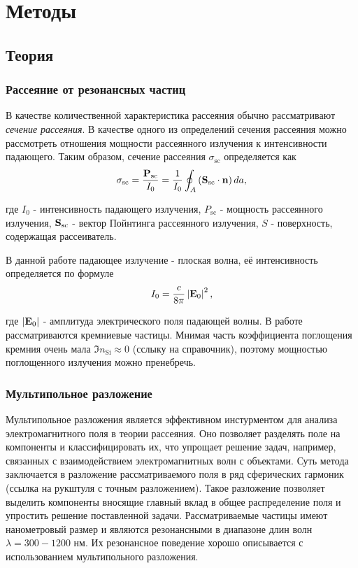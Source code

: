\chapter{Методы}


\section{Теория}\label{sec:theory}

\subsection{Рассеяние от резонансных частиц}\label{subsec:scat_cs}

В качестве количественной характеристика рассеяния обычно рассматривают \textit{сечение рассеяния}. В качестве одного из определений сечения рассеяния можно рассмотреть отношения мощности рассеянного излучения к интенсивности падающего. Таким образом, сечение рассеяния $\sigma_{\text{sc}}$ определяется как
\begin{equation}
    \sigma_{\text{sc}} = \frac{\vb{P_{\text{sc}}}}{I_0} = \frac{1}{I_0} \oint_A  \left(  \mathbf{S}_{\text{sc}} \cdot \vb{n} \right) da,
\end{equation}

где $I_0$ - интенсивность падающего излучения, $P_{\text{sc}}$ - мощность рассеянного излучения, $\vb{S}_{\text{sc}}$ - вектор Пойнтинга рассеянного излучения, $S$ - поверхность, содержащая рассеиватель.

В данной работе падающее излучение - плоская волна, её интенсивность определяется по формуле
\begin{equation}
    I_0 = \frac{c}{8\pi} \left| \vb{E}_0 \right|^2,
\end{equation}

где $\left| \vb{E}_0 \right|$ - амплитуда электрического поля падающей волны.
В работе рассматриваются кремниевые частицы. Мнимая часть коэффициента поглощения кремния очень мала $\Im{n_{\text{Si}}} \approx 0$ (сслыку на справочник), поэтому мощностью поглощенного излучения можно пренебречь. 

\subsection{Мультипольное разложение}\label{subsec:mult_decomp}

Мультипольное разложения является эффективном инстурментом для анализа электромагнитного поля в теории рассеяния. Оно позволяет разделять поле на компоненты и классифицировать их, что упрощает решение задач, например, связанных с взаимодействием электромагнитных волн с объектами. Суть метода заключается в разложение рассматриваемого поля в ряд сферических гармоник (ссылка на  рукштуля с точным разложением). Такое разложение позволяет выделить компоненты вносящие главный вклад в общее распределение поля и упростить решение поставленной задачи.
Рассматриваемые частицы имеют нанометровый размер и являются резонансными в диапазоне длин волн $\lambda = 300-1200$ нм. Их резонансное поведение хорошо описывается с использованием мультипольного разложения. 

